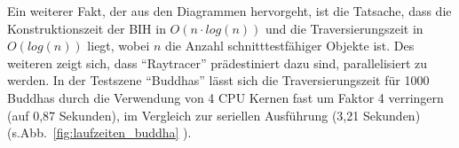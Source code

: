 Ein weiterer Fakt, der aus den Diagrammen hervorgeht, ist die Tatsache, dass die Konstruktionszeit der BIH in \( O(n \cdot log(n)) \) und die Traversierungszeit in \( O(log(n)) \) liegt, wobei \( n \) die Anzahl schnitttestfähiger Objekte ist. Des weiteren zeigt sich, dass "`Raytracer"' prädestiniert dazu sind, parallelisiert zu werden. In der Testszene "`Buddhas"' lässt sich die Traversierungszeit für 1000 Buddhas durch die Verwendung von 4 CPU Kernen fast um Faktor 4 verringern (auf 0,87 Sekunden), im Vergleich zur seriellen Ausführung (3,21 Sekunden) (s.Abb.~\ref{fig:laufzeiten_buddha} ).
 


